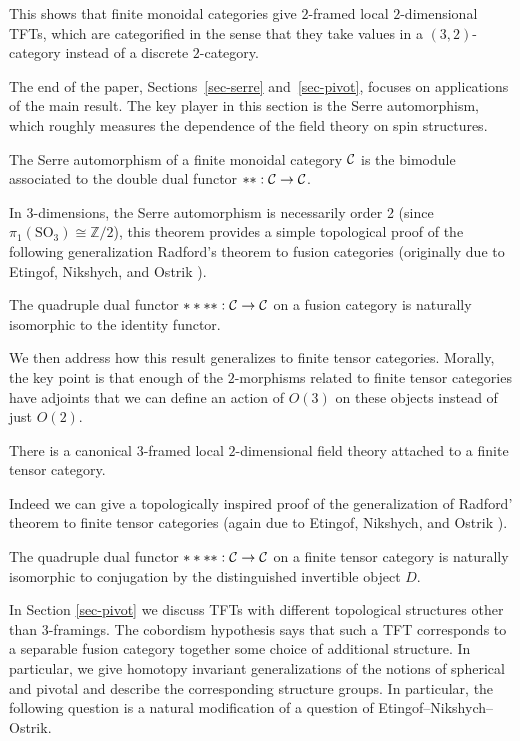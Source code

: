 \documentclass{amsart}
\begin{document}
This shows that finite monoidal categories give $2$-framed local $2$-dimensional TFTs, which are categorified in the sense that they take values in a $(3,2)$-category instead of a discrete $2$-category.

The end of the paper, Sections~\ref{sec-serre} and~\ref{sec-pivot}, focuses on applications of the main result.  The key player in this section is the Serre automorphism, which roughly measures the dependence of the field theory on spin structures.

\begin{theorem}
The Serre automorphism of a finite monoidal category $\mathcal C$ is the bimodule associated to the double dual functor $**: \mathcal C \rightarrow \mathcal C$.  
\end{theorem}

In $3$-dimensions, the Serre automorphism is necessarily order 2 (since $\pi_1(\mathrm{SO}_3) \cong \mathbb{Z}/2$), this theorem provides a simple topological proof of the following generalization Radford's theorem \cite{MR0407069} to fusion categories (originally due to Etingof, Nikshych, and Ostrik \cite{MR2183279}).
\begin{corollary}
The quadruple dual functor $****: \mathcal C \rightarrow \mathcal C$ on a fusion category is naturally isomorphic to the identity functor.
\end{corollary}

We then address how this result generalizes to finite tensor categories.  Morally, the key point is that enough of the $2$-morphisms related to finite tensor categories have adjoints that we can define an action of $O(3)$ on these objects instead of just $O(2)$.

\begin{theorem}
There is a canonical $3$-framed local $2$-dimensional field theory attached to a finite tensor category.
\end{theorem}

Indeed we can give a topologically inspired proof of the generalization of Radford' theorem to finite tensor categories (again due to Etingof, Nikshych, and Ostrik \cite{MR2097289}).

\begin{corollary}
The quadruple dual functor $****: \mathcal C \rightarrow \mathcal C$ on a finite tensor category is naturally isomorphic to conjugation by the distinguished invertible object $D$.
\end{corollary}

In Section \ref{sec-pivot} we discuss TFTs with different topological structures other than $3$-framings.  The cobordism hypothesis says that such a TFT corresponds to a separable fusion category together some choice of additional structure.  In particular, we give homotopy invariant generalizations of the notions of spherical and pivotal and describe the corresponding structure groups.  In particular, the following question is a natural modification of a question of Etingof--Nikshych--Ostrik.
\end{document}
